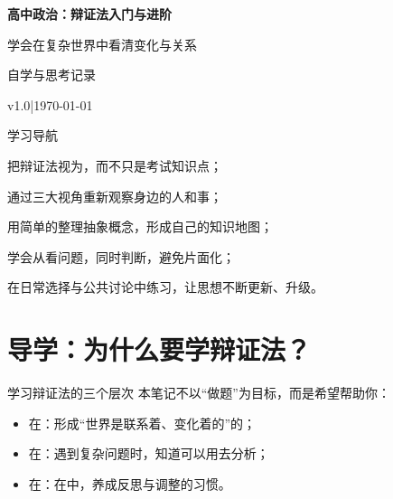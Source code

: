 \documentclass[a4paper,11pt]{ctexart}
\renewcommand{\notetitle}{高中政治：辩证法入门与进阶}
\renewcommand{\notesubtitle}{学会在复杂世界中看清变化与关系}
\renewcommand{\noteauthor}{自学与思考记录}
\renewcommand{\notedate}{\today}
\renewcommand{\noteversion}{v1.0}
\begin{document}
\thispagestyle{empty}
\setcounter{page}{1}

\MathNoteEnableReviewStamp
\MathNoteEnablePrint

\noindent
\begin{minipage}[t][0.7\textheight][c]{\textwidth}
  \raggedleft
  \vspace*{\fill}
  {\sffamily\bfseries\Huge\color{accent}\notetitle\par}
  \vspace{0.6em}
  {\Large\color{inkgray}\notesubtitle\par}
  \vspace{0.5em}
  {\large\color{inkgray}\noteauthor\par}
  \vspace{0.4em}
  {\normalsize\color{inkgray}\noteversion\quad|\quad\notedate\par}
  \vspace*{\fill}
\end{minipage}

\begin{center}
\begin{minipage}{0.84\textwidth}
  \textcolor{inkgray}{\sffamily\small 学习导航}\\[0.4em]
  \begin{focuspoints}
    \item 把辩证法视为，而不只是考试知识点；
    \item 通过三大视角重新观察身边的人和事；
    \item 用简单的整理抽象概念，形成自己的知识地图；
    \item 学会从看问题，同时判断，避免片面化；
    \item 在日常选择与公共讨论中练习，让思想不断更新、升级。
  \end{focuspoints}
\end{minipage}
\end{center}

\clearpage
\thispagestyle{plain}
\tableofcontents
\newpage

\section{导学：为什么要学辩证法？}

\begin{summarybox}{学习辩证法的三个层次}
本笔记不以“做题”为目标，而是希望帮助你：
\begin{itemize}
  \item 在：形成“世界是联系着、变化着的”的；
  \item 在：遇到复杂问题时，知道可以用去分析；
  \item 在：在中，养成反思与调整的习惯。
\end{itemize}
\end{summarybox}
\end{document}
